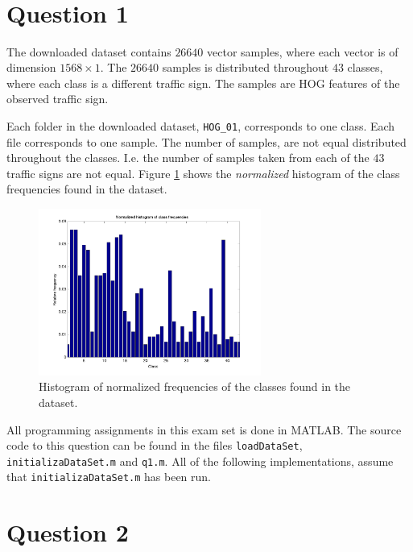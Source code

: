 \documentclass[10pt]{article}
\author{\authorName \\\texttt{\small{\authorEmail}}}
\title{\textsc{\titleName \\ \courseName}}
\begin{document}
\maketitle 


\section*{Question 1} %
\label{sec:question_1}
The downloaded dataset contains $26640$ vector samples, where each vector is of dimension $1568 \times 1$. The $26640$ samples is distributed throughout $43$ classes, where each class is a different traffic sign. The samples are HOG features of the observed traffic sign.

Each folder in the downloaded dataset, \texttt{HOG_01}, corresponds to one class. Each file corresponds to one sample. The number of samples, are not equal distributed throughout the classes. I.e. the number of samples taken from each of the $43$ traffic signs are not equal. Figure \ref{fig1} shows the \emph{normalized} histogram of the class frequencies found in the dataset.

\begin{figure}[ht]
\centering
\includegraphics[width=0.65\textwidth]{figures/q1.png}
\caption{Histogram of normalized frequencies of the classes found in the dataset.}
\label{fig1}
\end{figure}


All programming assignments in this exam set is done in MATLAB. The source code to this question can be found in the files \texttt{loadDataSet}, \texttt{initializaDataSet.m} and \texttt{q1.m}. All of the following implementations, assume that \texttt{initializaDataSet.m} has been run.


\section*{Question 2} %
\label{sec:question_2}
\end{document}
